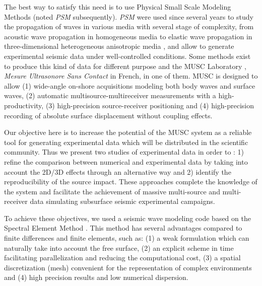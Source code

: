 \documentclass[manuscript,revised]{geophysics}
\newcommand{\psm}{\textit{PSM} }
\newcommand{\thrd}{three-dimensional }
\begin{document}
\noindent The best way to satisfy this need is to use Physical Small Scale Modeling Methods (noted \psm subsequently). \psm were used since several years to study the propagation of waves in various media with several stage of complexity, from acoustic wave propagation in homogeneous media to elastic wave propagation in \thrd heterogeneous anisotropic media \citep{Rieber_EWP_1936,Howes_SMS_1953,Hilterman_TDM_1970,French_MRP_1974,Bishop_LVM_1985,Pratt_FWI_1999,Favretto_NMT_2013,Sarkar_TPM_2003,Isaac_SMS_1999}, and allow to generate experimental seismic data under well-controlled conditions. Some methods exist to produce this kind of data for different purpose \citep{Wong_SPM_2009} and the MUSC Laboratory \citep{Bretaudeau_SSA_2008b,Bretaudeau_SSM_2011,Bretaudeau_FWI_2013}, \textit{Mesure Ultrasonore Sans Contact} in French, in one of them. MUSC is designed to allow (1) wide-angle on-shore acquisitions modeling both body waves and surface waves, (2) automatic multisource-multireceiver measurements with a high-productivity, (3) high-precision source-receiver positioning and (4) high-precision recording of absolute surface displacement without coupling effects. 

\noindent Our objective here is to increase the potential of the MUSC system as a reliable tool for generating experimental data which will be distributed in the scientific community. 
\noindent Thus we present two studies of experimental data in order to : 1) refine the comparison between numerical and experimental data by taking into account the 2D/3D effects through an alternative way and 2) identify the reproducibility of the source impact. These approaches complete the knowledge of the system and facilitate the achievement of massive multi-source and multi-receiver data simulating subsurface seismic experimental campaigns.

\noindent To achieve these objectives, we used a seismic wave modeling code based on the Spectral Element Method \citep{Komatitsch_SEM_1998,Komatitsch_ISM_1999,Komatitsch_SEM_2005,Festa_PML_2005}. This method has several advantages compared to finite differences and finite elements, such as: (1) a weak formulation which can naturally take into account the free surface, (2) an explicit scheme in time facilitating parallelization and reducing the computational cost, (3) a spatial discretization (mesh) convenient for the representation of complex environments and (4) high precision results and low numerical dispersion.
\end{document}
